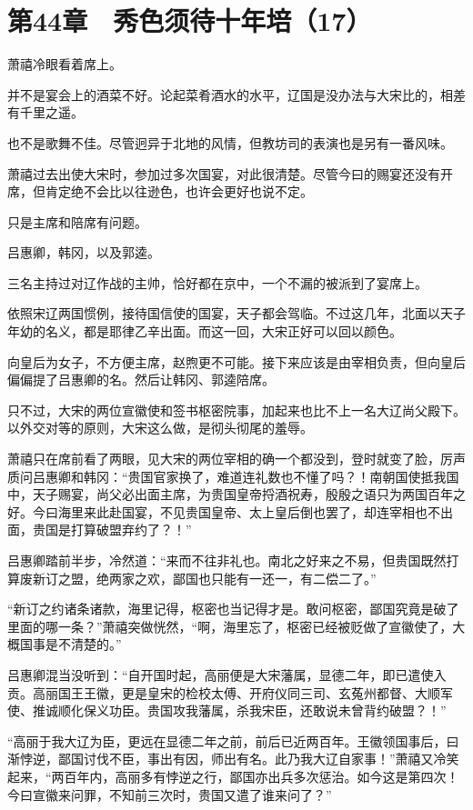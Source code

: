 \section{第44章　秀色须待十年培（17）}

萧禧冷眼看着席上。

并不是宴会上的酒菜不好。论起菜肴酒水的水平，辽国是没办法与大宋比的，相差有千里之遥。

也不是歌舞不佳。尽管迥异于北地的风情，但教坊司的表演也是另有一番风味。

萧禧过去出使大宋时，参加过多次国宴，对此很清楚。尽管今曰的赐宴还没有开席，但肯定绝不会比以往逊色，也许会更好也说不定。

只是主席和陪席有问题。

吕惠卿，韩冈，以及郭逵。

三名主持过对辽作战的主帅，恰好都在京中，一个不漏的被派到了宴席上。

依照宋辽两国惯例，接待国信使的国宴，天子都会驾临。不过这几年，北面以天子年幼的名义，都是耶律乙辛出面。而这一回，大宋正好可以回以颜色。

向皇后为女子，不方便主席，赵煦更不可能。接下来应该是由宰相负责，但向皇后偏偏提了吕惠卿的名。然后让韩冈、郭逵陪席。

只不过，大宋的两位宣徽使和签书枢密院事，加起来也比不上一名大辽尚父殿下。以外交对等的原则，大宋这么做，是彻头彻尾的羞辱。

萧禧只在席前看了两眼，见大宋的两位宰相的确一个都没到，登时就变了脸，厉声质问吕惠卿和韩冈：“贵国官家换了，难道连礼数也不懂了吗？！南朝国使抵我国中，天子赐宴，尚父必出面主席，为贵国皇帝捋酒祝寿，殷殷之语只为两国百年之好。今曰海里来此赴国宴，不见贵国皇帝、太上皇后倒也罢了，却连宰相也不出面，贵国是打算破盟弃约了？！”

吕惠卿踏前半步，冷然道：“来而不往非礼也。南北之好来之不易，但贵国既然打算废新订之盟，绝两家之欢，鄙国也只能有一还一，有二偿二了。”

“新订之约诸条诸款，海里记得，枢密也当记得才是。敢问枢密，鄙国究竟是破了里面的哪一条？”萧禧突做恍然，“啊，海里忘了，枢密已经被贬做了宣徽使了，大概国事是不清楚的。”

吕惠卿混当没听到：“自开国时起，高丽便是大宋藩属，显德二年，即已遣使入贡。高丽国王王徽，更是皇宋的检校太傅、开府仪同三司、玄菟州都督、大顺军使、推诚顺化保义功臣。贵国攻我藩属，杀我宋臣，还敢说未曾背约破盟？！”

“高丽于我大辽为臣，更远在显德二年之前，前后已近两百年。王徽领国事后，曰渐悖逆，鄙国讨伐不臣，事出有因，师出有名。此乃我大辽自家事！”萧禧又冷笑起来，“两百年内，高丽多有悖逆之行，鄙国亦出兵多次惩治。如今这是第四次！今曰宣徽来问罪，不知前三次时，贵国又遣了谁来问了？”

